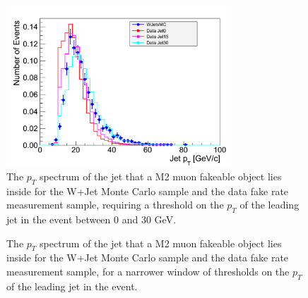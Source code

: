 \begin{figure}[!htbp]
\begin{center}
\includegraphics[width=0.75\textwidth]{figures/LeptonJetPt_MuonM2_0To30.pdf}
\caption{The $p_{T}$ spectrum of the jet that a M2 muon fakeable object lies inside for the 
W+Jet Monte Carlo sample and the data fake rate measurement sample, requiring a threshold on the $p_{T}$ of 
the leading jet in the event between $0$ and $30$ GeV.}
\label{fig:mu_M2_fr_jetspectrum0To30}
\end{center}
\end{figure}

\begin{figure}[!htbp]
\begin{center}
\caption{The $p_{T}$ spectrum of the jet that a M2 muon fakeable object lies inside for the 
W+Jet Monte Carlo sample and the data fake rate measurement sample, for a narrower window of thresholds
on the $p_{T}$ of the leading jet in the event.}
\label{fig:mu_M2_fr_jetspectrumNarrowerWindow}
\end{center}
\end{figure}



